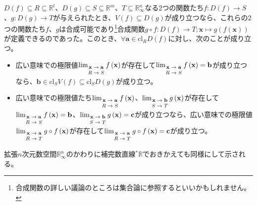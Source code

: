 \documentclass[dvipdfmx]{jsarticle}
\begin{document}
\begin{thm}\label{4.1.10.4}
$D(f) \subseteq R \subseteq \mathbb{R}^{l}$、$D(g) \subseteq S \subseteq \mathbb{R}^{m}$、$T \subseteq \mathbb{R}_{\infty}^{n}$なる2つの関数たち$f:D(f) \rightarrow S$、$g:D(g) \rightarrow T$が与えられたとき、$V(f) \subseteq D(g)$が成り立つなら、これらの2つの関数たち$f$、$g$は合成可能であり\footnote{合成関数の詳しい議論のところは集合論に参照するといいかもしれません。}合成関数$g \circ f:D(f) \rightarrow T;\mathbf{x} \mapsto g\left( f\left( \mathbf{x} \right) \right)$が定義できるのであった。このとき、$\forall\mathbf{a} \in \mathrm{cl}_{R}{D(f)}$に対し、次のことが成り立つ。
\begin{itemize}
\item
  広い意味での極限値$\lim_{\scriptsize \begin{matrix} \mathbf{x} \rightarrow \mathbf{a} \\ R \rightarrow S \end{matrix}}{f\left( \mathbf{x} \right)}$が存在して$\lim_{\scriptsize \begin{matrix} \mathbf{x} \rightarrow \mathbf{a} \\ R \rightarrow S \end{matrix}}{f\left( \mathbf{x} \right)} = \mathbf{b}$が成り立つなら、$\mathbf{b} \in \mathrm{cl}_{S}{V(f)} \subseteq \mathrm{cl}_{S}{D(g)}$が成り立つ。
\item
  広い意味での極限値たち$\lim_{\scriptsize \begin{matrix} \mathbf{x} \rightarrow \mathbf{a} \\ R \rightarrow S \end{matrix}}{f\left( \mathbf{x} \right)}$、$\lim_{\scriptsize \begin{matrix} \mathbf{x} \rightarrow \mathbf{b} \\S \rightarrow T \end{matrix}}{g\left( \mathbf{x} \right)}$が存在して$\lim_{\scriptsize \begin{matrix} \mathbf{x} \rightarrow \mathbf{a} \\ R \rightarrow S \end{matrix}}{f\left( \mathbf{x} \right)} = \mathbf{b}$、$\lim_{\scriptsize \begin{matrix} \mathbf{x} \rightarrow \mathbf{b} \\S \rightarrow T \end{matrix}}{g\left( \mathbf{x} \right)} = \mathbf{c}$が成り立つなら、広い意味での極限値$\lim_{\scriptsize \begin{matrix} \mathbf{x} \rightarrow \mathbf{a} \\ R \rightarrow T \end{matrix}}{g \circ f\left( \mathbf{x} \right)}$が存在して$\lim_{\scriptsize \begin{matrix} \mathbf{x} \rightarrow \mathbf{a} \\ R \rightarrow T \end{matrix}}{g \circ f\left( \mathbf{x} \right)} = \mathbf{c}$が成り立つ。
\end{itemize}\par
拡張$n$次元数空間$\mathbb{R}_{\infty}^{n}$のかわりに補完数直線${}^{*}\mathbb{R}$でおきかえても同様にして示される。
\end{thm}
\end{document}
